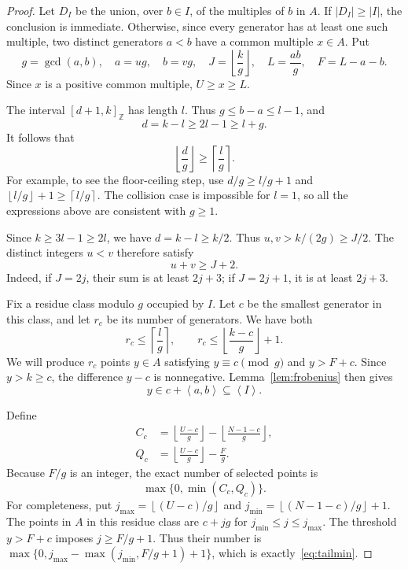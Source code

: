 \documentclass[11pt,a4paper]{article}
\numberwithin{equation}{section}
\theoremstyle{remark}
\newcommand{\Z}{\mathbb Z}
\newcommand{\sg}[1]{\left\langle #1\right\rangle}
\newcommand{\floor}[1]{\left\lfloor #1\right\rfloor}
\newcommand{\ceil}[1]{\left\lceil #1\right\rceil}
\newcommand{\interval}[2]{[#1,#2]_{\Z}}
\begin{document}
\begin{proof}
Let $D_I$ be the union, over $b\in I$, of the multiples of $b$ in $A$.
If $|D_I|\ge|I|$, the conclusion is immediate.
Otherwise, since every generator has at least one such multiple, two
distinct generators $a<b$ have a common multiple $x\in A$.
Put
\begin{equation}\label{eq:tailparameters}
  g=\gcd(a,b),\quad a=ug,\quad b=vg,\quad
  J=\floor{\frac{k}{g}},\quad
  L=\frac{ab}{g},\quad F=L-a-b.
\end{equation}
Since $x$ is a positive common multiple, $U\ge x\ge L$.

The interval $\interval{d+1}{k}$ has length $l$. Thus
$g\le b-a\le l-1$, and
\[
  d=k-l\ge2l-1\ge l+g.
\]
It follows that
\begin{equation}\label{eq:tailwidth}
  \floor{\frac{d}{g}}\ge\ceil{\frac{l}{g}}.
\end{equation}
For example, to see the floor-ceiling step, use
$d/g\ge l/g+1$ and
$\floor{l/g}+1\ge\ceil{l/g}$.
The collision case is impossible for $l=1$, so all the expressions
above are consistent with $g\ge1$.

Since $k\ge3l-1\ge2l$, we have $d=k-l\ge k/2$.
Thus $u,v>k/(2g)\ge J/2$.
The distinct integers $u<v$ therefore satisfy
\begin{equation}\label{eq:tailsum}
  u+v\ge J+2.
\end{equation}
Indeed, if $J=2j$, their sum is at least $2j+3$; if $J=2j+1$,
it is at least $2j+3$.

Fix a residue class modulo $g$ occupied by $I$.
Let $c$ be the smallest generator in this class, and let $r_c$ be its
number of generators. We have both
\begin{equation}\label{eq:tailrc}
  r_c\le\ceil{\frac{l}{g}},
  \qquad
  r_c\le\floor{\frac{k-c}{g}}+1.
\end{equation}
We will produce $r_c$ points $y\in A$ satisfying
$y\equiv c\pmod g$ and $y>F+c$.
Since $y>k\ge c$, the difference $y-c$ is nonnegative.
Lemma~\ref{lem:frobenius} then gives
\[
  y\in c+\sg{a,b}\subseteq\sg{I}.
\]

Define
\begin{equation}\label{eq:tailcapacities}
  \begin{split}
  C_c&=\floor{\frac{U-c}{g}}-\floor{\frac{N-1-c}{g}},\\
  Q_c&=\floor{\frac{U-c}{g}}-\frac{F}{g}.
  \end{split}
\end{equation}
Because $F/g$ is an integer, the exact number of selected points is
\begin{equation}\label{eq:tailmin}
  \max\{0,\min(C_c,Q_c)\}.
\end{equation}
For completeness, put
$j_{\max}=\floor{(U-c)/g}$ and
$j_{\min}=\floor{(N-1-c)/g}+1$.
The points in $A$ in this residue class are $c+jg$ for
$j_{\min}\le j\le j_{\max}$.
The threshold $y>F+c$ imposes $j\ge F/g+1$.
Thus their number is
$\max\{0,j_{\max}-\max(j_{\min},F/g+1)+1\}$,
which is exactly~\eqref{eq:tailmin}.


\end{proof}
\end{document}
